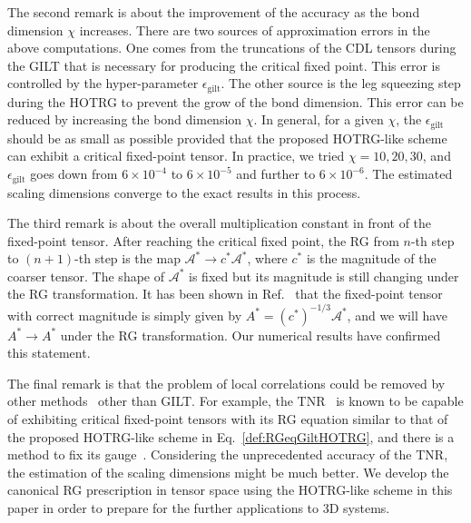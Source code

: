 \documentclass[aps,prr,reprint,superscriptaddress,nofootinbib,floatfix]{revtex4-2}
\begin{document}
The second remark is about the improvement of the accuracy as the bond dimension $\chi$ increases. 
There are two sources of approximation errors in the above computations. 
One comes from the truncations of the CDL tensors during the GILT that is necessary for producing the critical fixed point. 
This error is controlled by the hyper-parameter $\epsilon_{\text{gilt}}$. 
The other source is the leg squeezing step during the HOTRG to prevent the grow of the bond dimension.
This error can be reduced by increasing the bond dimension $\chi$. 
In general, for a given $\chi$, the $\epsilon_{\text{gilt}}$ should be as small as possible provided that the proposed HOTRG-like scheme can exhibit a critical fixed-point tensor. 
In practice, we tried $\chi = 10, 20, 30$, and $\epsilon_{\text{gilt}}$ goes down from $6\times 10^{-4}$ to $6\times10^{-5}$ and further to $6\times10^{-6}$. 
The estimated scaling dimensions converge to the exact results in this process. 
%

The third remark is about the overall multiplication constant in front of the fixed-point tensor. 
After reaching the critical fixed point, the RG from $n$-th step to $(n+1)$-th step is the map $\mathcal{A}^{*}\rightarrow c^{*} \mathcal{A}^{*}$, where $c^{*}$ is the magnitude of the coarser tensor. 
The shape of $\mathcal{A}^*$ is fixed but its magnitude is still changing under the RG transformation. 
It has been shown in Ref.~\cite{GuWen2009} that the fixed-point tensor with correct magnitude is simply given by $A^* = (c^*)^{-1/3} \mathcal{A}^*$, and we will have $A^*\rightarrow A^*$ under the RG transformation.
Our numerical results have confirmed this statement.
%

The final remark is that the problem of local correlations could be removed by other methods~\cite{GuWen2009,tnr,tnralgo,tnrplus,looptnr,harada2018,fet,tns,tensor-ring} other than GILT.
For example, the TNR~\cite{tnr,tnralgo} is known to be capable of exhibiting critical fixed-point tensors with its RG equation similar to that of the proposed HOTRG-like scheme in Eq.~\eqref{def:RGeqGiltHOTRG}, and there is a method to fix its gauge~\cite{tnralgo}. 
Considering the unprecedented accuracy of the TNR, the estimation of the scaling dimensions might be much better.
We develop the canonical RG prescription in tensor space using the HOTRG-like scheme in this paper in order to prepare for the further applications to 3D systems.
%
\end{document}

